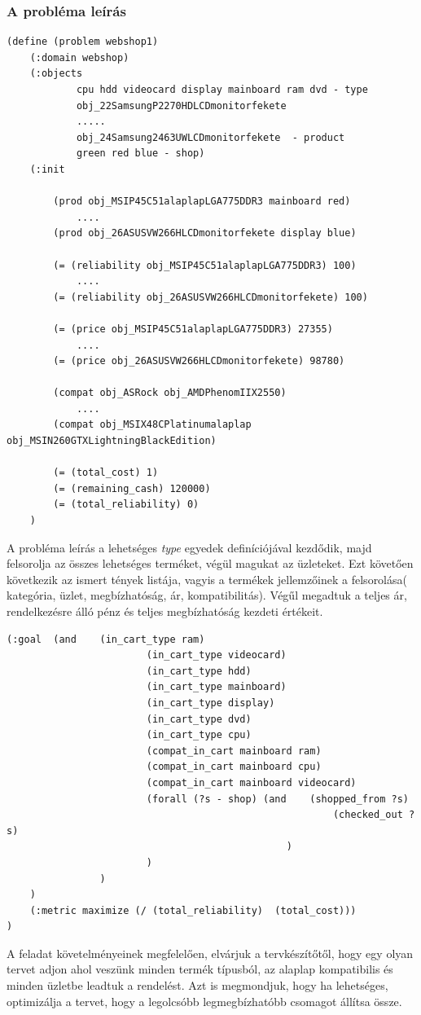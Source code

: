 \subsubsection{A probléma leírás}
\begin{lstlisting}[frame=single]	
(define (problem webshop1)
	(:domain webshop)
	(:objects
			cpu hdd videocard display mainboard ram dvd - type
			obj_22SamsungP2270HDLCDmonitorfekete  
			.....
			obj_24Samsung2463UWLCDmonitorfekete  - product
			green red blue - shop)
	(:init
		
		(prod obj_MSIP45C51alaplapLGA775DDR3 mainboard red)
			....
		(prod obj_26ASUSVW266HLCDmonitorfekete display blue)
		
		(= (reliability obj_MSIP45C51alaplapLGA775DDR3) 100)
			....
		(= (reliability obj_26ASUSVW266HLCDmonitorfekete) 100)
		
		(= (price obj_MSIP45C51alaplapLGA775DDR3) 27355)
			....
		(= (price obj_26ASUSVW266HLCDmonitorfekete) 98780)
		
		(compat obj_ASRock obj_AMDPhenomIIX2550)
			....
		(compat obj_MSIX48CPlatinumalaplap obj_MSIN260GTXLightningBlackEdition)
		
		(= (total_cost) 1)
		(= (remaining_cash) 120000)
		(= (total_reliability) 0)
	)
\end{lstlisting}
A probléma leírás a lehetséges \emph{type} egyedek definíciójával kezdődik, majd felsorolja az összes lehetséges terméket, végül magukat az üzleteket.  Ezt követően következik az ismert tények listája, vagyis a termékek jellemzőinek a felsorolása( kategória, üzlet, megbízhatóság, ár, kompatibilitás). Végűl megadtuk a teljes ár, rendelkezésre álló pénz és teljes megbízhatóság kezdeti értékeit.

\begin{lstlisting}[frame=single]	
	(:goal 	(and	(in_cart_type ram)
						(in_cart_type videocard)
						(in_cart_type hdd)
						(in_cart_type mainboard)
						(in_cart_type display)
						(in_cart_type dvd)
						(in_cart_type cpu)
						(compat_in_cart mainboard ram)
						(compat_in_cart mainboard cpu)
						(compat_in_cart mainboard videocard)
						(forall (?s - shop) (and 	(shopped_from ?s)
														(checked_out ?s)
												)
						)
				)
	)
	(:metric maximize (/ (total_reliability)  (total_cost)))
)
\end{lstlisting}
A feladat követelményeinek megfelelően, elvárjuk a tervkészítőtől, hogy egy olyan tervet adjon ahol veszünk minden termék típusból, az alaplap kompatibilis és minden üzletbe leadtuk a rendelést. Azt is megmondjuk, hogy ha lehetséges, optimizálja a tervet, hogy a legolcsóbb legmegbízhatóbb csomagot állítsa össze.

